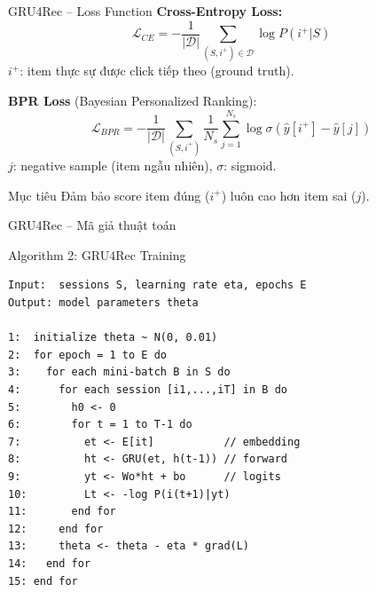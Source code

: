 \documentclass[aspectratio=169, 11pt]{beamer}
\begin{document}
\begin{frame}{GRU4Rec -- Loss Function}
\textbf{Cross-Entropy Loss:}
\begin{equation}
\mathcal{L}_{CE} = -\frac{1}{|\mathcal{D}|} \sum_{(S, i^+) \in \mathcal{D}} \log P(i^+ | S)
\end{equation}
\small $i^+$: item thực sự được click tiếp theo (ground truth).

\vspace{0.5cm}
\normalsize
\textbf{BPR Loss} (Bayesian Personalized Ranking):
\begin{equation}
\mathcal{L}_{BPR} = -\frac{1}{|\mathcal{D}|} \sum_{(S, i^+)} \frac{1}{N_s}\sum_{j=1}^{N_s} \log \sigma(\hat{y}[i^+] - \hat{y}[j])
\end{equation}
\small $j$: negative sample (item ngẫu nhiên), $\sigma$: sigmoid.

\vspace{0.3cm}
\normalsize
\begin{alertblock}{Mục tiêu}
Đảm bảo score item đúng ($i^+$) luôn cao hơn item sai ($j$).
\end{alertblock}
\end{frame}

\begin{frame}[fragile]{GRU4Rec -- Mã giả thuật toán}
\vspace{-0.2cm}
\scriptsize
\begin{block}{Algorithm 2: GRU4Rec Training}
\begin{verbatim}
Input:  sessions S, learning rate eta, epochs E
Output: model parameters theta

1:  initialize theta ~ N(0, 0.01)
2:  for epoch = 1 to E do
3:    for each mini-batch B in S do
4:      for each session [i1,...,iT] in B do
5:        h0 <- 0
6:        for t = 1 to T-1 do
7:          et <- E[it]           // embedding
8:          ht <- GRU(et, h(t-1)) // forward
9:          yt <- Wo*ht + bo      // logits
10:         Lt <- -log P(i(t+1)|yt)
11:       end for
12:     end for
13:     theta <- theta - eta * grad(L)
14:   end for
15: end for
\end{verbatim}
\end{block}
\end{frame}
\end{document}
